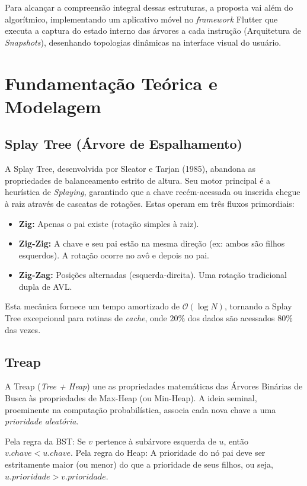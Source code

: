 \documentclass[12pt,a4paper]{article}
\begin{document}
Para alcançar a compreensão integral dessas estruturas, a proposta vai além do algorítmico, implementando um aplicativo móvel no \textit{framework} Flutter que executa a captura do estado interno das árvores a cada instrução (Arquitetura de \textit{Snapshots}), desenhando topologias dinâmicas na interface visual do usuário.

\section{Fundamentação Teórica e Modelagem}

\subsection{Splay Tree (Árvore de Espalhamento)}
A Splay Tree, desenvolvida por Sleator e Tarjan (1985), abandona as propriedades de balanceamento estrito de altura. Seu motor principal é a heurística de \textit{Splaying}, garantindo que a chave recém-acessada ou inserida chegue à raiz através de cascatas de rotações. Estas operam em três fluxos primordiais:
\begin{itemize}
    \item \textbf{Zig:} Apenas o pai existe (rotação simples à raiz).
    \item \textbf{Zig-Zig:} A chave e seu pai estão na mesma direção (ex: ambos são filhos esquerdos). A rotação ocorre no avô e depois no pai.
    \item \textbf{Zig-Zag:} Posições alternadas (esquerda-direita). Uma rotação tradicional dupla de AVL.
\end{itemize}
Esta mecânica fornece um tempo amortizado de $\mathcal{O}(\log N)$, tornando a Splay Tree excepcional para rotinas de \textit{cache}, onde $20\%$ dos dados são acessados $80\%$ das vezes.

\subsection{Treap}
A Treap (\textit{Tree + Heap}) une as propriedades matemáticas das Árvores Binárias de Busca às propriedades de Max-Heap (ou Min-Heap). A ideia seminal, proeminente na computação probabilística, associa cada nova chave a uma \textit{prioridade aleatória}.

Pela regra da BST: Se $v$ pertence à subárvore esquerda de $u$, então $v.chave < u.chave$. Pela regra do Heap: A prioridade do nó pai deve ser estritamente maior (ou menor) do que a prioridade de seus filhos, ou seja, $u.prioridade > v.prioridade$.
\end{document}
